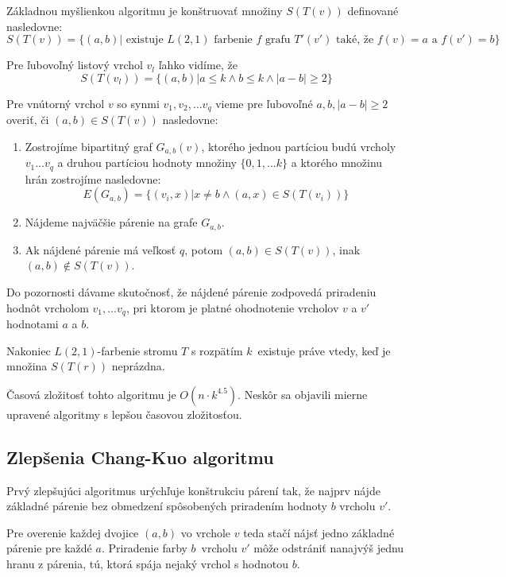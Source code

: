 Základnou myšlienkou algoritmu je konštruovať množiny $S(T(v))$ definované nasledovne:
$$S(T(v)) = \{ (a, b) | \textrm{ existuje } L(2,1) \textrm{ farbenie } f \textrm{ grafu } T'(v') \textrm{ také, že } f(v) = a \textrm{ a } f(v') = b\}$$

Pre ľubovoľný listový vrchol $v_l$ ľahko vidíme, že 
$$S(T(v_l)) = \{ (a, b) | a \leq k \wedge b \leq k \wedge |a - b| \ge 2\}$$

Pre vnútorný vrchol $v$ so synmi $v_1, v_2, \ldots v_q$ vieme pre ľubovoľné $a, b, |a - b| \ge 2$ overiť,
či $(a, b) \in S(T(v))$ nasledovne:

\begin{enumerate}
    \item Zostrojíme bipartitný graf $G_{a,b}(v)$, ktorého jednou partíciou budú vrcholy $v_1 \ldots v_q$ a
    druhou partíciou hodnoty množiny $\{0, 1, \ldots k\}$ a ktorého množinu hrán zostrojíme nasledovne:
    $$E(G_{a,b}) = \{ (v_i, x) | x \neq b \wedge (a, x) \in S(T(v_i))\}$$
    \item Nájdeme najväčšie párenie na grafe $G_{a,b}$.
    \item Ak nájdené párenie má veľkosť $q$, potom $(a,b) \in S(T(v))$, inak $(a,b) \notin S(T(v))$.
\end{enumerate}

Do pozornosti dávame skutočnosť, že nájdené párenie zodpovedá priradeniu hodnôt vrcholom
$v_1, \ldots v_q$, pri ktorom je platné ohodnotenie vrcholov $v$ a $v'$ hodnotami $a$ a $b$.

Nakoniec $L(2,1)$-farbenie stromu $T$ s rozpätím $k$ existuje práve vtedy, keď je množina
$S(T(r))$ neprázdna.

Časová zložitosť tohto algoritmu je $O(n \cdot k^{4.5})$\cite{chang_kuo}. Neskôr sa objavili
mierne upravené algoritmy s lepšou časovou zložitosťou.

\subsection{Zlepšenia Chang-Kuo algoritmu}

Prvý zlepšujúci algoritmus urýchľuje konštrukciu
párení tak, že najprv nájde základné párenie bez obmedzení spôsobených priradením hodnoty $b$
vrcholu $v'$.

Pre overenie každej dvojice $(a,b)$ vo vrchole $v$ teda stačí nájsť jedno základné
párenie pre každé $a$. Priradenie farby $b$ vrcholu $v'$ môže odstrániť nanajvýš jednu hranu z párenia,
tú, ktorá spája nejaký vrchol s hodnotou $b$. 

